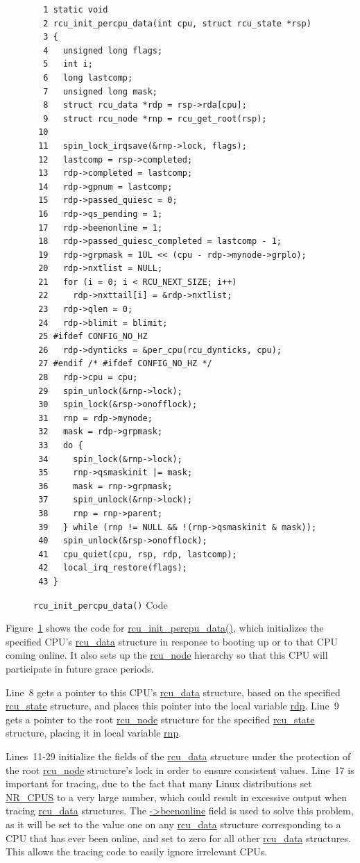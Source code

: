 \begin{figure}[tbp]
{ \scriptsize
\begin{verbatim}
  1 static void
  2 rcu_init_percpu_data(int cpu, struct rcu_state *rsp)
  3 {
  4   unsigned long flags;
  5   int i;
  6   long lastcomp;
  7   unsigned long mask;
  8   struct rcu_data *rdp = rsp->rda[cpu];
  9   struct rcu_node *rnp = rcu_get_root(rsp);
 10 
 11   spin_lock_irqsave(&rnp->lock, flags);
 12   lastcomp = rsp->completed;
 13   rdp->completed = lastcomp;
 14   rdp->gpnum = lastcomp;
 15   rdp->passed_quiesc = 0;
 16   rdp->qs_pending = 1;
 17   rdp->beenonline = 1;
 18   rdp->passed_quiesc_completed = lastcomp - 1;
 19   rdp->grpmask = 1UL << (cpu - rdp->mynode->grplo);
 20   rdp->nxtlist = NULL;
 21   for (i = 0; i < RCU_NEXT_SIZE; i++)
 22     rdp->nxttail[i] = &rdp->nxtlist;
 23   rdp->qlen = 0;
 24   rdp->blimit = blimit;
 25 #ifdef CONFIG_NO_HZ
 26   rdp->dynticks = &per_cpu(rcu_dynticks, cpu);
 27 #endif /* #ifdef CONFIG_NO_HZ */
 28   rdp->cpu = cpu;
 29   spin_unlock(&rnp->lock);
 30   spin_lock(&rsp->onofflock);
 31   rnp = rdp->mynode;
 32   mask = rdp->grpmask;
 33   do {
 34     spin_lock(&rnp->lock);
 35     rnp->qsmaskinit |= mask;
 36     mask = rnp->grpmask;
 37     spin_unlock(&rnp->lock);
 38     rnp = rnp->parent;
 39   } while (rnp != NULL && !(rnp->qsmaskinit & mask));
 40   spin_unlock(&rsp->onofflock);
 41   cpu_quiet(cpu, rsp, rdp, lastcomp);
 42   local_irq_restore(flags);
 43 }
\end{verbatim}
}
\caption{{\tt rcu\_init\_percpu\_data()} Code}
\label{fig:app:rcuimpl:rcutreewt:Code for rcu-init-percpu-data}
\end{figure}

Figure~\ref{fig:app:rcuimpl:rcutreewt:Code for rcu-init-percpu-data}
shows the code for \url{rcu_init_percpu_data()}, which initializes
the specified CPU's \url{rcu_data} structure in response to booting
up or to that CPU coming online.
It also sets up the \url{rcu_node} hierarchy so that this CPU will
participate in future grace periods.

Line~8 gets a pointer to this CPU's \url{rcu_data} structure, based
on the specified \url{rcu_state} structure, and places this pointer
into the local variable \url{rdp}.
Line~9 gets a pointer to the root \url{rcu_node} structure for the
specified \url{rcu_state} structure, placing it in local variable
\url{rnp}.

Lines~11-29 initialize the fields of the \url{rcu_data} structure
under the protection of the root \url{rcu_node} structure's lock
in order to ensure consistent values.
Line~17 is important for tracing, due to the fact that many Linux
distributions set \url{NR_CPUS} to a very large number, which could
result in excessive output when tracing \url{rcu_data} structures.
The \url{->beenonline} field is used to solve this problem, as
it will be set to the value one on any \url{rcu_data} structure
corresponding to a CPU that has ever been online, and set to zero
for all other \url{rcu_data} structures.
This allows the tracing code to easily ignore irrelevant CPUs.

